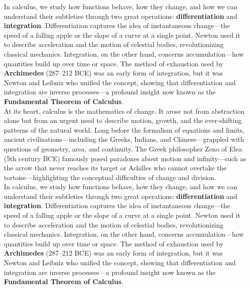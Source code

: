\documentclass{book}
\begin{document}
In calculus, we study how functions behave, how they change, and how we can understand their subtleties through two great operations: \textbf{differentiation} and \textbf{integration}. Differentiation captures the idea of instantaneous change---the speed of a falling apple or the slope of a curve at a single point. Newton used it to describe acceleration and the motion of celestial bodies, revolutionizing classical mechanics. Integration, on the other hand, concerns accumulation---how quantities build up over time or space. The method of exhaustion used by \textbf{Archimedes} (287--212 BCE) was an early form of integration, but it was Newton and Leibniz who unified the concept, showing that differentiation and integration are inverse processes---a profound insight now known as the \textbf{Fundamental Theorem of Calculus}.\\

At its heart, calculus is the mathematics of change. It arose not from abstraction alone but from an urgent need to describe motion, growth, and the ever-shifting patterns of the natural world. Long before the formalism of equations and limits, ancient civilizations---including the Greeks, Indians, and Chinese---grappled with questions of geometry, area, and continuity. The Greek philosopher Zeno of Elea (5th century BCE) famously posed paradoxes about motion and infinity---such as the arrow that never reaches its target or Achilles who cannot overtake the tortoise---highlighting the conceptual difficulties of change and division.\\

In calculus, we study how functions behave, how they change, and how we can understand their subtleties through two great operations: \textbf{differentiation} and \textbf{integration}. Differentiation captures the idea of instantaneous change---the speed of a falling apple or the slope of a curve at a single point. Newton used it to describe acceleration and the motion of celestial bodies, revolutionizing classical mechanics. Integration, on the other hand, concerns accumulation---how quantities build up over time or space. The method of exhaustion used by \textbf{Archimedes} (287--212 BCE) was an early form of integration, but it was Newton and Leibniz who unified the concept, showing that differentiation and integration are inverse processes---a profound insight now known as the \textbf{Fundamental Theorem of Calculus}.\\
\end{document}
